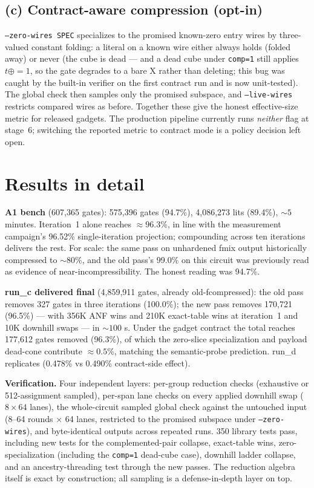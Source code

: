 \documentclass[11pt]{article}
\newcommand{\code}[1]{\texttt{#1}}
\begin{document}
\subsection*{(c) Contract-aware compression (opt-in)}

\code{--zero-wires SPEC} specializes to the promised known-zero entry wires by three-valued constant folding: a literal on a known wire either always holds (folded away) or never (the cube is dead --- and a dead cube under \code{comp=1} still applies $t \mathbin{\oplus}= 1$, so the gate degrades to a bare X rather than deleting; this bug was caught by the built-in verifier on the first contract run and is now unit-tested). The global check then samples only the promised subspace, and \code{--live-wires} restricts compared wires as before. Together these give the honest effective-size metric for released gadgets. The production pipeline currently runs \emph{neither} flag at stage~6; switching the reported metric to contract mode is a policy decision left open.

\section{Results in detail}

\textbf{A1 bench} (607{,}365 gates): 575{,}396 gates (94.7\%), 4{,}086{,}273 lits (89.4\%), ${\sim}5$ minutes. Iteration~1 alone reaches ${\approx}96.3\%$, in line with the measurement campaign's 96.52\% single-iteration projection; compounding across ten iterations delivers the rest. For scale: the same pass on unhardened fmix output historically compressed to ${\sim}80\%$, and the old pass's 99.0\% on this circuit was previously read as evidence of near-incompressibility. The honest reading was 94.7\%.

\textbf{run\_c delivered final} (4{,}859{,}911 gates, already old-fcompressed): the old pass removes 327 gates in three iterations (100.0\%); the new pass removes 170{,}721 (96.5\%) --- with 356K ANF wins and 210K exact-table wins at iteration~1 and 10K downhill swaps --- in ${\sim}100$ s. Under the gadget contract the total reaches 177{,}612 gates removed (96.3\%), of which the zero-slice specialization and payload dead-cone contribute ${\approx}0.5\%$, matching the semantic-probe prediction. run\_d replicates (0.478\% vs 0.490\% contract-side effect).

\textbf{Verification.} Four independent layers: per-group reduction checks (exhaustive or 512-assignment sampled), per-span lane checks on every applied downhill swap ($8\times 64$ lanes), the whole-circuit sampled global check against the untouched input (8--64 rounds $\times$ 64 lanes, restricted to the promised subspace under \code{--zero-wires}), and byte-identical outputs across repeated runs. 350 library tests pass, including new tests for the complemented-pair collapse, exact-table wins, zero-specialization (including the \code{comp=1} dead-cube case), downhill ladder collapse, and an ancestry-threading test through the new passes. The reduction algebra itself is exact by construction; all sampling is a defense-in-depth layer on top.
\end{document}
